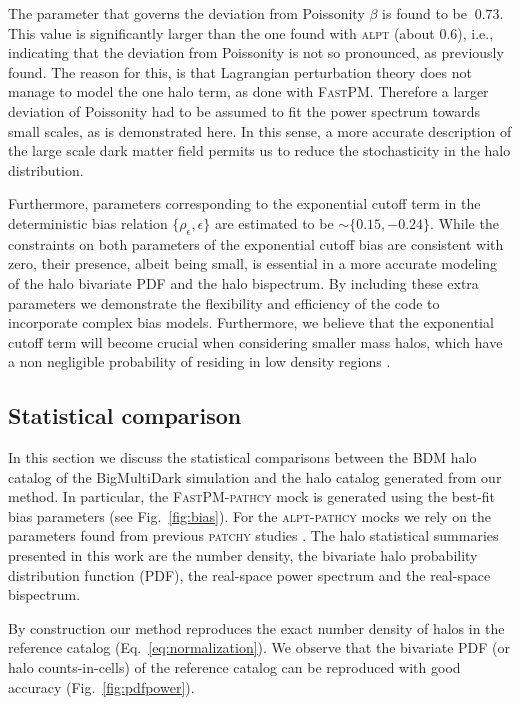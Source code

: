 \documentclass[english,usenatbib]{mn2e}
\begin{document}
The parameter that governs the deviation from Poissonity $\beta$ is found to be $~ 0.73$. This value is significantly larger than the one found with \textsc{alpt} (about 0.6), i.e., indicating that the deviation from Poissonity is not so pronounced, as previously found. The reason for this, is that Lagrangian perturbation theory does not manage to model the one halo term, as done with \textsc{FastPM}. Therefore a larger deviation of Poissonity had to be assumed to fit the power spectrum towards small scales, as is demonstrated here. In this sense, a more accurate description of the large scale dark matter field permits us to reduce the stochasticity in the halo distribution.

Furthermore, parameters corresponding to the exponential cutoff term in the deterministic bias relation $\{\rho_{\epsilon},\epsilon\}$ are estimated to be $\sim \{0.15,-0.24\}$. While the constraints on both parameters of the exponential cutoff bias are consistent with zero, their presence, albeit being small, is essential in a more accurate modeling of the halo bivariate PDF and the halo bispectrum. By including these extra parameters we demonstrate the flexibility and  efficiency of the code to incorporate complex bias models. Furthermore, we believe that the  exponential cutoff term will become crucial when considering smaller mass halos, which have a non negligible probability of residing in low density regions \citep[][]{neyrinck2014}.


\subsection{Statistical comparison}
\label{sec:stats}

In this section we discuss the statistical comparisons between the BDM halo catalog of the BigMultiDark simulation and the halo catalog generated from our method. In particular, the \textsc{FastPM}-\textsc{pathcy} mock is generated using the best-fit bias parameters (see Fig.~\ref{fig:bias}). For the \textsc{alpt}-\textsc{pathcy} mocks we rely on the parameters found from previous \textsc{patchy} studies \citep{kitaura2016}. The halo statistical summaries presented in this work are the number density, the bivariate halo probability distribution function (PDF), the real-space power spectrum and the real-space bispectrum. 

By construction our method reproduces the exact number density of halos in the reference catalog (Eq.~\ref{eq:normalization}). We observe that the bivariate PDF (or halo counts-in-cells) of the reference catalog can be reproduced with good accuracy (Fig.~\ref{fig:pdfpower}). 
\end{document}
